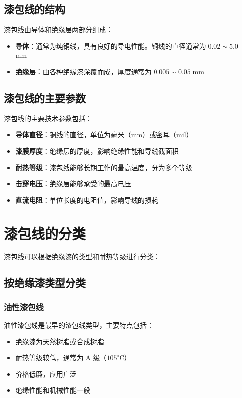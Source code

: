 \documentclass[12pt,UTF8]{ctexbook}
\begin{document}
\subsection{漆包线的结构}

漆包线由导体和绝缘层两部分组成：

\begin{itemize}[leftmargin=2cm]
    \item \textbf{导体}：通常为纯铜线，具有良好的导电性能。铜线的直径通常为 $0.02 \sim 5.0$ mm
    \item \textbf{绝缘层}：由各种绝缘漆涂覆而成，厚度通常为 $0.005 \sim 0.05$ mm
\end{itemize}

\subsection{漆包线的主要参数}

漆包线的主要技术参数包括：

\begin{itemize}[leftmargin=2cm]
    \item \textbf{导体直径}：铜线的直径，单位为毫米（mm）或密耳（mil）
    \item \textbf{漆膜厚度}：绝缘层的厚度，影响绝缘性能和导线截面积
    \item \textbf{耐热等级}：漆包线能够长期工作的最高温度，分为多个等级
    \item \textbf{击穿电压}：绝缘层能够承受的最高电压
    \item \textbf{直流电阻}：单位长度的电阻值，影响导线的损耗
\end{itemize}

\section{漆包线的分类}

漆包线可以根据绝缘漆的类型和耐热等级进行分类：

\subsection{按绝缘漆类型分类}

\subsubsection{油性漆包线}

油性漆包线是最早的漆包线类型，主要特点包括：

\begin{itemize}[leftmargin=2cm]
    \item 绝缘漆为天然树脂或合成树脂
    \item 耐热等级较低，通常为 A 级（$105^\circ$C）
    \item 价格低廉，应用广泛
    \item 绝缘性能和机械性能一般
\end{itemize}
\end{document}
